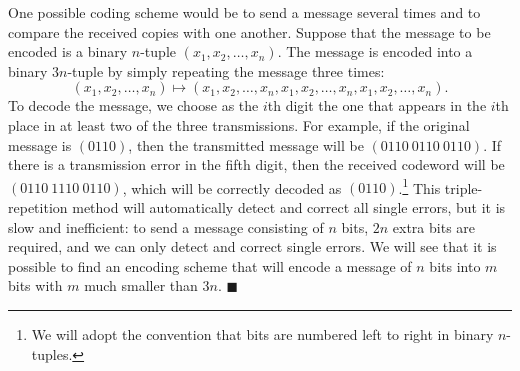  
One possible coding scheme would be to send a message several
times and to compare the received copies with one another. Suppose
that the message to be encoded is a binary $n$-tuple $(x_{1}, x_{2},
\ldots, x_{n})$. The message is encoded into a binary $3n$-tuple by
simply repeating the message three times: 
\[
(x_{1}, x_{2}, \ldots, x_{n})
\mapsto
(x_{1}, x_{2}, \ldots, x_{n}, x_{1}, x_{2}, \ldots, x_{n},
x_{1}, x_{2}, \ldots, x_{n}).
\]
To decode the message, we choose as the $i$th digit the one that
appears in the $i$th place in at least two of the three transmissions.
For example, if the original message is $(0110)$, then the transmitted
message will be \mbox{$(0110\:0110\:0110)$}. If there is a transmission error
in the fifth digit, then the received codeword will be
$(0110\:1110\:0110)$, which will be correctly decoded as
$(0110)$.\footnote{We will adopt the convention that bits are numbered
left to right in binary $n$-tuples.} 
This triple-repetition method will automatically detect and correct
all single errors, but it is slow and inefficient: to send a message
consisting of $n$ bits, $2n$ extra bits are required, and we can only
detect and correct single errors. We will see that it is possible to
find an encoding scheme that will encode a message of $n$ bits into
$m$ bits with $m$ much smaller than $3n$.
\hspace{\fill} $\blacksquare$
 
 
\vspace{1.5ex}
 
